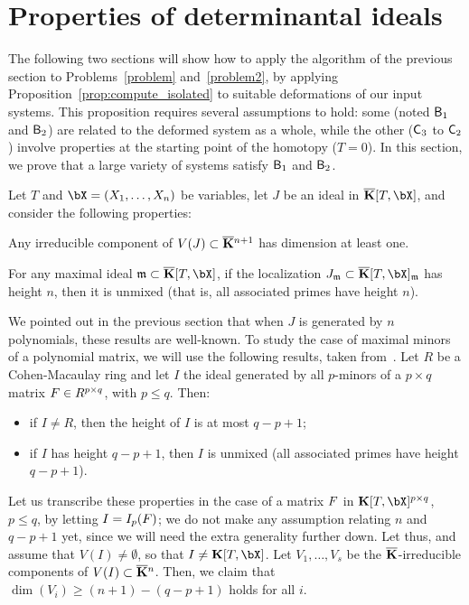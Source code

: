 \documentclass[12pt]{article}
\begin{document}
\section{Properties of determinantal ideals}\label{sec:check}

The following two sections will show how to apply the algorithm of the
previous section to Problems~\ref{problem} and~\ref{problem2}, by
applying Proposition~\ref{prop:compute_isolated} to suitable
deformations of our input systems. This proposition requires several
assumptions to hold: some (noted $\mathsf{B}_1$ and $\mathsf{B}_2$) are related
to the deformed system as a whole, while the other ($\mathsf{C}_3$ to
$\mathsf{C}_2$) involve properties at the starting point of the homotopy
($T=0$). In this section, we prove that a large variety of systems
satisfy $\mathsf{B}_1$ and $\mathsf{B}_2$.

Let $T$ and $\bX=(X_1,\dots,X_n)$ be variables, let $J$ be an ideal in
$\KKbar[T,\bX]$, and consider the following properties:
\begin{description}[leftmargin=*]
\item[$\assA_1.$] Any irreducible component of $V(J) \subset
  \overline{\mathbf{K}}{}^{n+1}$ has dimension at least one.
\item[$\assA_2.$] For any maximal ideal $\m \subset\KKbar[T,\bX]$,
  if the localization $J_\m \subset \KKbar[T,\bX]_\m$ has height $n$,
  then it is unmixed (that is, all associated primes have height $n$).
\end{description}

We pointed out in the previous section that when $J$ is generated by
$n$ polynomials, these results are well-known. To study the case of
maximal minors of a polynomial matrix, we will use the following
results, taken from~\cite[Section~6]{EN62}. Let $R$ be a
Cohen-Macaulay ring and let $I$ the ideal generated by all $p$-minors
of a $p\times q$ matrix ${F} \in R^{p\times q}$, with $p \le q$. Then:
\begin{itemize}
\item if $I \ne R$, then the height of $I$ is at most $q-p+1$;
\item if $I$ has height $q-p+1$, then $I$ is unmixed (all associated
  primes have height $q-p+1$).
\end{itemize}
Let us transcribe these properties in the case of a matrix ${F}$ in
$\KK[T,\bX]^{p \times q}$, $p \le q$, by letting $I=I_p({F})$; we do not make any
assumption relating $n$ and $q-p+1$ yet, since we will need the extra
generality further down. Let thus, and assume that $V(I)\ne
\emptyset$, so that $I \ne \KK[T,\bX]$. Let $V_1,\dots,V_s$ be the
$\overline{\mathbf{K}}$-irreducible components of $V(I)\subset \overline{\mathbf{K}}{}^n$.  Then, we
claim that $\dim(V_i) \ge (n+1) -(q-p+1)$ holds for all $i$.
\end{document}
